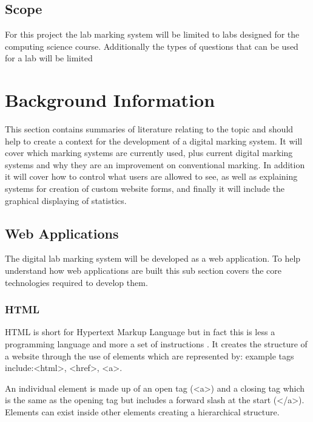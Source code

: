\documentclass[11pt]{report}
\newcommand{\tag}[1]{\textless {#1}\textgreater}
\begin{document}
\section{Scope}

For this project the lab marking system will be limited to labs designed for the computing science course. Additionally the types of questions that can be used for a lab will be limited 




\newpage
\chapter{Background Information}
This section contains summaries of literature relating to the topic and should help to create a context for the development of a digital marking system. It will cover which marking systems are currently used, plus  current digital marking systems  and why they are an improvement on conventional marking. In addition it will cover how to control what users are allowed to see, as well as explaining systems for creation of custom website forms, and finally it will include the graphical displaying of statistics. 


\section{Web Applications}

The digital lab marking system will be developed as a web application. To help understand how web applications are built this sub section covers the core technologies required to develop them.

\subsection{HTML}
HTML is short for Hypertext Markup Language but in fact this is less a programming language and more a set of instructions \cite{brooks_introduction_2007}. It creates the structure of a website through the use of elements which are represented by: example tags include:\tag{html}, \tag{href}, \tag{a}. 

\noindent An individual element is made up of an open tag (\tag{a}) and a closing tag which is the same as the opening tag but includes a forward slash at the start (\tag{/a}). Elements can exist inside other elements creating a hierarchical structure.
\end{document}
